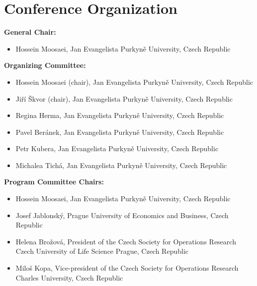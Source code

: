 \chapter{Conference Organization}

\textbf{General Chair:}
\begin{itemize}[nosep]
     \item Hossein Moosaei, Jan Evangelista Purkyně University, Czech Republic
\end{itemize}

\medskip

\textbf{Organizing Committee:}
\begin{itemize}[nosep]
     \item Hossein Moosaei (chair),  Jan Evangelista Purkyně University, Czech Republic
     \item Jiří Škvor (chair),  Jan Evangelista Purkyně University, Czech Republic
     \item Regina Herma, Jan Evangelista Purkyně University, Czech Republic
     \item Pavel Beránek,  Jan Evangelista Purkyně University, Czech Republic
     \item Petr Kubera, Jan Evangelista Purkyně University, Czech Republic
     \item Michalea Tichá, Jan Evangelista Purkyně University, Czech Republic
\end{itemize}

\medskip

\textbf{Program Committee Chairs:}
\begin{itemize}[nosep]
     \item Hossein Moosaei, Jan Evangelista Purkyně University, Czech Republic
     \item Josef Jablonský, Prague University of Economics and Business, Czech Republic
     \item Helena Brožová, President of the Czech Society for Operations Research Czech University of Life Science Prague, Czech Republic
     \item Miloš Kopa, Vice-president of the Czech Society for Operations Research Charles University, Czech Republic
\end{itemize}

\medskip


